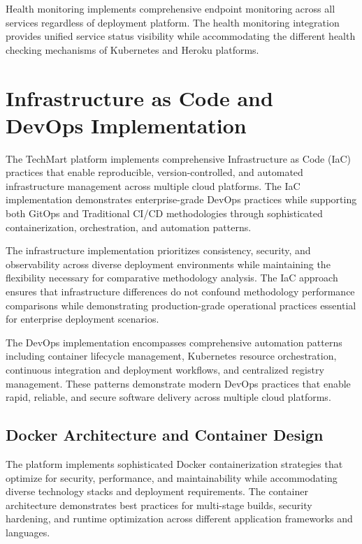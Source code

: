Health monitoring implements comprehensive endpoint monitoring across all services regardless of deployment platform. The health monitoring integration provides unified service status visibility while accommodating the different health checking mechanisms of Kubernetes and Heroku platforms.

\section{Infrastructure as Code and DevOps Implementation}

The TechMart platform implements comprehensive Infrastructure as Code (IaC) practices that enable reproducible, version-controlled, and automated infrastructure management across multiple cloud platforms. The IaC implementation demonstrates enterprise-grade DevOps practices while supporting both GitOps and Traditional CI/CD methodologies through sophisticated containerization, orchestration, and automation patterns.

The infrastructure implementation prioritizes consistency, security, and observability across diverse deployment environments while maintaining the flexibility necessary for comparative methodology analysis. The IaC approach ensures that infrastructure differences do not confound methodology performance comparisons while demonstrating production-grade operational practices essential for enterprise deployment scenarios.

The DevOps implementation encompasses comprehensive automation patterns including container lifecycle management, Kubernetes resource orchestration, continuous integration and deployment workflows, and centralized registry management. These patterns demonstrate modern DevOps practices that enable rapid, reliable, and secure software delivery across multiple cloud platforms.

\subsection{Docker Architecture and Container Design}

The platform implements sophisticated Docker containerization strategies that optimize for security, performance, and maintainability while accommodating diverse technology stacks and deployment requirements. The container architecture demonstrates best practices for multi-stage builds, security hardening, and runtime optimization across different application frameworks and languages.

